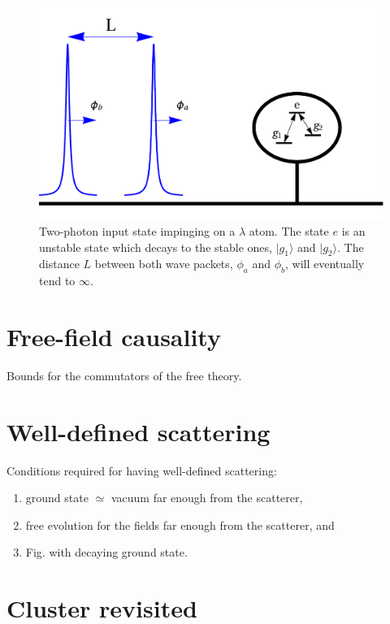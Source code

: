 \documentclass[aps,pra,reprint,amsmath,amssymb]{revtex4-1}
\begin{document}
\begin{figure}
\includegraphics[scale=0.25]{input.pdf}
\caption{Two-photon input state impinging on a $\lambda$ atom. The state $e$ is an unstable state which decays to the stable ones, $|g_1\rangle$ and $|g_2\rangle$. The distance $L$ between both wave packets, $\phi_a$ and $\phi_b$, will eventually tend to $\infty$.}
\label{fig:input}
\end{figure}

\section{Free-field causality}

{\color{blue}Bounds for the commutators of the free theory.}

\section{Well-defined scattering}

{\color{blue}Conditions required for having well-defined scattering:

\begin{enumerate}
\item ground state $\simeq$ vacuum far enough from the scatterer,
\item free evolution for the fields far enough from the scatterer, and
\item Fig. with decaying ground state.
\end{enumerate}
}

\section{Cluster revisited}
\end{document}
